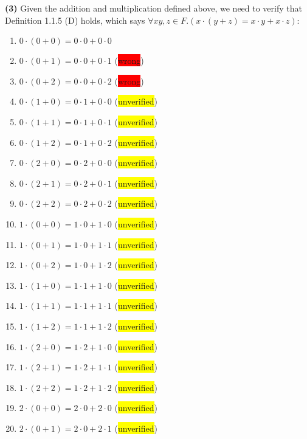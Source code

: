 \documentclass[12pt, letterpaper, oneside]{book}
\begin{document}
\textbf{(3)} Given the addition and multiplication defined above, we need to verify that Definition 1.1.5 (D) holds,
which says $\forall x y, z \in F. (x \cdot (y + z) = x \cdot y + x \cdot z)$:
\begin{enumerate}
  \item $0 \cdot (0 + 0) = 0 \cdot 0 + 0 \cdot 0$
  \item $0 \cdot (0 + 1) = 0 \cdot 0 + 0 \cdot 1$ (\colorbox{red}{wrong})
  \item $0 \cdot (0 + 2) = 0 \cdot 0 + 0 \cdot 2$ (\colorbox{red}{wrong})
  \item $0 \cdot (1 + 0) = 0 \cdot 1 + 0 \cdot 0$ (\colorbox{yellow}{unverified})
  \item $0 \cdot (1 + 1) = 0 \cdot 1 + 0 \cdot 1$ (\colorbox{yellow}{unverified})
  \item $0 \cdot (1 + 2) = 0 \cdot 1 + 0 \cdot 2$ (\colorbox{yellow}{unverified})
  \item $0 \cdot (2 + 0) = 0 \cdot 2 + 0 \cdot 0$ (\colorbox{yellow}{unverified})
  \item $0 \cdot (2 + 1) = 0 \cdot 2 + 0 \cdot 1$ (\colorbox{yellow}{unverified})
  \item $0 \cdot (2 + 2) = 0 \cdot 2 + 0 \cdot 2$ (\colorbox{yellow}{unverified})
  \item $1 \cdot (0 + 0) = 1 \cdot 0 + 1 \cdot 0$ (\colorbox{yellow}{unverified})
  \item $1 \cdot (0 + 1) = 1 \cdot 0 + 1 \cdot 1$ (\colorbox{yellow}{unverified})
  \item $1 \cdot (0 + 2) = 1 \cdot 0 + 1 \cdot 2$ (\colorbox{yellow}{unverified})
  \item $1 \cdot (1 + 0) = 1 \cdot 1 + 1 \cdot 0$ (\colorbox{yellow}{unverified})
  \item $1 \cdot (1 + 1) = 1 \cdot 1 + 1 \cdot 1$ (\colorbox{yellow}{unverified})
  \item $1 \cdot (1 + 2) = 1 \cdot 1 + 1 \cdot 2$ (\colorbox{yellow}{unverified})
  \item $1 \cdot (2 + 0) = 1 \cdot 2 + 1 \cdot 0$ (\colorbox{yellow}{unverified})
  \item $1 \cdot (2 + 1) = 1 \cdot 2 + 1 \cdot 1$ (\colorbox{yellow}{unverified})
  \item $1 \cdot (2 + 2) = 1 \cdot 2 + 1 \cdot 2$ (\colorbox{yellow}{unverified})
  \item $2 \cdot (0 + 0) = 2 \cdot 0 + 2 \cdot 0$ (\colorbox{yellow}{unverified})
  \item $2 \cdot (0 + 1) = 2 \cdot 0 + 2 \cdot 1$ (\colorbox{yellow}{unverified})

\end{enumerate}
\end{document}
